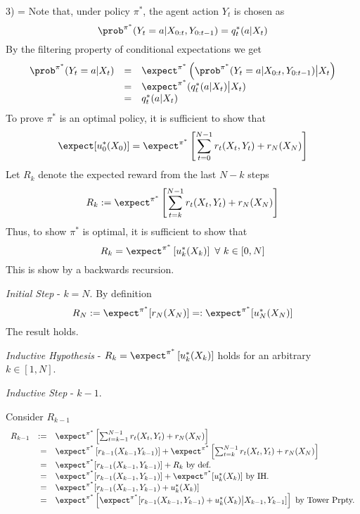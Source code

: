 \documentclass[11pt,a4paper]{article}
\begin{document}
\begin{answer}{3)}
  \everymath={\displaystyle}
  Note that, under policy $\pi^*$, the agent action $Y_t$ is chosen as
  \[ \prob^{\pi^*}(Y_t=a|X_{0:t},Y_{0:t-1})=q_t^*(a|X_t) \]
  By the filtering property of conditional expectations we get
  \[\begin{array}{rcl}
    \prob^{\pi^*}(Y_t=a|X_t)&=&\expect^{\pi^*}\left(\prob^{\pi^*}(Y_t=a|X_{0:t},Y_{0:t-1})\big|X_t\right)\\
    &=&\expect^{\pi^*}(q_t^*(a|X_t)\big|X_t)\\
    &=&q_t^*(a|X_t)
  \end{array}\]
  To prove $\pi^*$ is an optimal policy, it is sufficient to show that
  \[ \expect[u_0^*(X_0)]=\expect^{\pi^*}\left[\sum_{t=0}^{N-1}r_t(X_t,Y_t)+r_N(X_N)\right] \]
  Let $R_k$ denote the expected reward from the last $N-k$ steps
  \[ R_k:=\expect^{\pi^*}\left[\sum_{t=k}^{N-1}r_t(X_t,Y_t)+r_N(X_N)\right] \]
  Thus, to show $\pi^*$ is optimal, it is sufficient to show that
  \begin{equation}
    R_k=\expect^{\pi^*}\left[u_k^*(X_k)\right]\ \forall\ k\in[0,N]
    \label{3_target}
  \end{equation}
  This is show by a backwards recursion.
  \par \textit{Initial Step} - $k=N$.
  By definition
  \[ R_N:=\expect^{\pi^*}[r_N(X_N)]=:\expect^{\pi^*}[u_N^*(X_N)] \]
  The result holds.
  \par \textit{Inductive Hypothesis} - $R_k=\expect^{\pi^*}\left[u_k^*(X_k)\right]$ holds for an arbitrary $k\in[1,N]$.
  \par \textit{Inductive Step} - $k-1$.
  \par Consider $R_{k-1}$
  \[\begin{array}{rrl}
    R_{k-1}&:=&\expect^{\pi^*}\left[\sum_{t=k-1}^{N-1}r_t(X_t,Y_t)+r_N(X_N)\right]\\
    &=&\expect^{\pi^*}\left[r_{k-1}(X_{k-1}Y_{k-1})\right]+\expect^{\pi^*}\left[\sum_{t=k}^{N-1}r_t(X_t,Y_t)+r_N(X_N)\right]\\
    &=&\expect^{\pi^*}[r_{k-1}(X_{k-1},Y_{k-1})]+R_k\text{ by def.}\\
    &=&\expect^{\pi^*}[r_{k-1}(X_{k-1},Y_{k-1})]+\expect^{\pi^*}[u_k^*(X_k)]\text{ by IH.}\\
    &=&\expect^{\pi^*}[r_{k-1}(X_{k-1},Y_{k-1})+u_k^*(X_k)]\\
    &=&\expect^{\pi^*}\left[\expect^{\pi^*}[r_{k-1}(X_{k-1},Y_{k-1})+u_k^*(X_k)\big|X_{k-1},Y_{k-1}]\right]\text{ by Tower Prpty.}\\

\end{array}\]
\end{answer}
\end{document}
